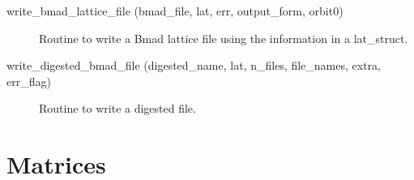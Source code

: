 \begin{description}
\label{r:write.bmad.lattice.file}
\item[write_bmad_lattice_file (bmad_file, lat, err, output_form, orbit0)] \Newline 
Routine to write a Bmad lattice file using the information in
a lat_struct.

\label{r:write.digested.bmad.file}
\item[write_digested_bmad_file (digested_name, lat, n_files, file_names, extra, err_flag)] \Newline
Routine to write a digested file. 
\end{description}

\section{Matrices}
\label{r:mat}

